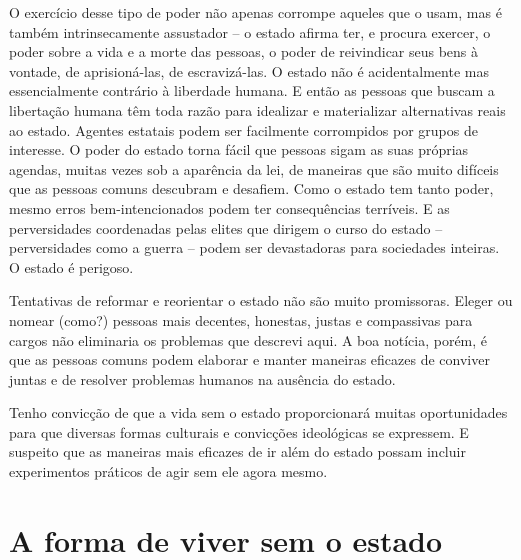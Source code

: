 O exercício desse tipo de poder não apenas corrompe aqueles que o usam, mas é também intrinsecamente assustador -- o estado afirma ter, e procura exercer, o poder sobre a vida e a morte das pessoas, o poder de reivindicar seus bens à vontade, de aprisioná-las, de escravizá-las. O estado não é acidentalmente mas essencialmente contrário à liberdade humana. E então as pessoas que buscam a libertação humana têm toda razão para idealizar e materializar alternativas reais ao estado. Agentes estatais podem ser facilmente corrompidos por grupos de interesse. O poder do estado torna fácil que pessoas sigam as suas próprias agendas, muitas vezes sob a aparência da lei, de maneiras que são muito difíceis que as pessoas comuns descubram e desafiem. Como o estado tem tanto poder, mesmo erros bem-intencionados podem ter consequências terríveis. E as perversidades coordenadas pelas elites que dirigem o curso do estado -- perversidades como a guerra -- podem ser devastadoras para sociedades inteiras. O estado é perigoso.

Tentativas de reformar e reorientar o estado não são muito promissoras. Eleger ou nomear (como?) pessoas mais decentes, honestas, justas e compassivas para cargos não eliminaria os problemas que descrevi aqui. A boa notícia, porém, é que as pessoas comuns podem elaborar e manter maneiras eficazes de conviver juntas e de resolver problemas humanos na ausência do estado.

Tenho convicção de que a vida sem o estado proporcionará muitas oportunidades para que diversas formas culturais e convicções ideológicas se expressem. E suspeito que as maneiras mais eficazes de ir além do estado possam incluir experimentos práticos de agir sem ele agora mesmo.

\section{A forma de viver sem o estado}

